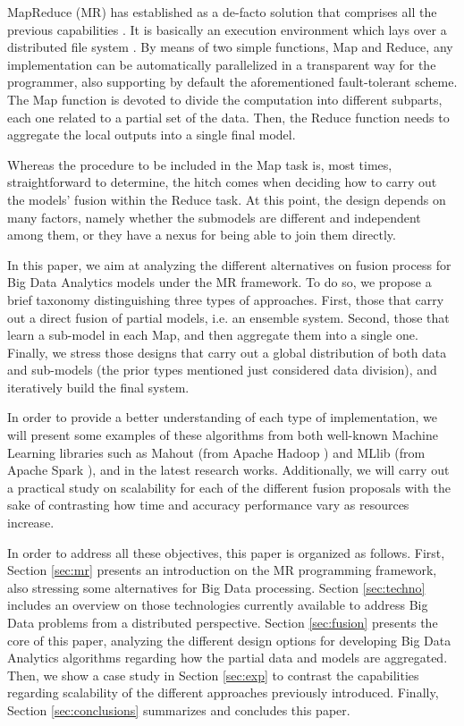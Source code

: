 \documentclass[3p,review]{elsarticle}
\begin{document}
MapReduce (MR) has established as a de-facto solution that comprises all the previous capabilities \cite{Dea08,Dean10,Lee11-MR}. It is basically an execution environment which lays over a distributed file system \cite{Shvachko10-HDFS}. By means of two simple functions, Map and Reduce, any implementation can be automatically parallelized in a transparent way for the programmer, also supporting by default the aforementioned fault-tolerant scheme. The Map function is devoted to divide the computation into different subparts, each one related to a partial set of the data. Then, the Reduce function needs to aggregate the local outputs into a single final model. 

Whereas the procedure to be included in the Map task is, most times, straightforward to determine, the hitch comes when deciding how to carry out the models' fusion within the Reduce task. At this point, the design depends on many factors, namely whether the submodels are different and independent among them, or they have a nexus for being able to join them directly. 

In this paper, we aim at analyzing the different alternatives on fusion process for Big Data Analytics models under the MR framework. To do so, we propose a brief taxonomy distinguishing three types of approaches. First, those that carry out a direct fusion of partial models, i.e. an ensemble system. Second, those that learn a sub-model in each Map, and then aggregate them into a single one. Finally, we stress those designs that carry out a global distribution of both data and sub-models (the prior types mentioned just considered data division), and iteratively build the final system.

In order to provide a better understanding of each type of implementation, we will present some examples of these algorithms from both well-known Machine Learning libraries such as Mahout \cite{Owe11,Mahout17,Mahout16-Book} (from Apache Hadoop \cite{Lam11,Whi15-Hadoop}) and MLlib \cite{MLlib} (from Apache Spark \cite{Zaharia10,zaharia12}), and in the latest research works. Additionally, we will carry out a practical study on scalability for each of the different fusion proposals with the sake of contrasting how time and accuracy performance vary as resources increase. 

In order to address all these objectives, this paper is organized as follows. First, Section \ref{sec:mr} presents an introduction on the MR programming framework, also stressing some alternatives for Big Data processing. Section \ref{sec:techno} includes an overview on those technologies currently available to address Big Data problems from a distributed perspective. Section \ref{sec:fusion} presents the core of this paper, analyzing the different design options for developing Big Data Analytics algorithms regarding how the partial data and models are aggregated. Then, we show a case study in Section \ref{sec:exp} to contrast the capabilities regarding scalability of the different approaches previously introduced. Finally, Section \ref{sec:conclusions} summarizes and concludes this paper.
\end{document}

